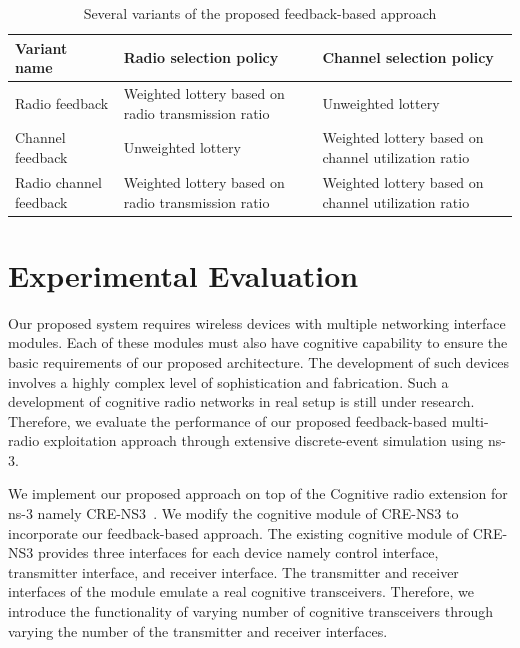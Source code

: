 \documentclass[letterpaper,conference]{IEEEtran}
\begin{document}
\begin{table}
\begin{center}
  \caption{Several variants of the proposed feedback-based approach}
  \label{tab:variantDefintion}
  \begin{tabular}{lll}
    \toprule
    Variant name & Radio selection policy & Channel selection policy\\
    \midrule
    Radio feedback & Weighted lottery based on radio transmission ratio & Unweighted lottery \\
    Channel feedback & Unweighted lottery  & Weighted lottery based on channel utilization ratio \\
    Radio channel feedback & Weighted lottery based on radio transmission ratio & Weighted lottery based on channel utilization ratio \\
    \bottomrule
  \end{tabular}
\end{center}
\vspace{-0.8cm}
\end{table}



\section{Experimental Evaluation}
\label{sec:results}

Our proposed system requires wireless devices with multiple networking interface modules. Each of these modules must also have cognitive capability to ensure the basic requirements of our proposed architecture. The development of such devices involves a highly complex level of sophistication and fabrication. Such a development of cognitive radio networks in real setup is still under research. Therefore, we evaluate the performance of our proposed feedback-based multi-radio exploitation approach through extensive discrete-event simulation using ns-3.

We implement our proposed approach on top of the Cognitive radio extension for ns-3 namely CRE-NS3~\cite{al2014simulating}. We modify the cognitive module of CRE-NS3 to incorporate our feedback-based approach. The existing cognitive module of CRE-NS3 provides three interfaces for each device namely control interface, transmitter interface, and receiver interface. The transmitter and receiver interfaces of the module emulate a real cognitive transceivers. Therefore, we introduce the functionality of varying number of cognitive transceivers through varying the number of the transmitter and receiver interfaces.
\end{document}
